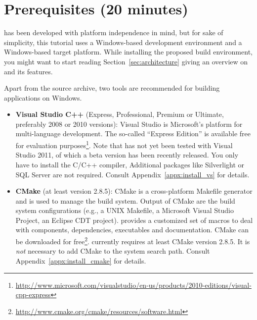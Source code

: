 %
% 
%
%
%
%

\section{Prerequisites (20 minutes)}
\xme has been developed with platform independence in mind, but for sake of simplicity,
this tutorial uses a Windows-based development environment and a Windows-based target platform.
%
While installing the proposed build environment, you might want to start reading Section~\ref{sec:architecture} giving an overview on \xme and its features.

Apart from the \xme source archive, two tools are recommended for building \xme applications on Windows.
\begin{itemize}
	\item \textbf{Visual Studio C++} (Express, Professional, Premium or Ultimate, preferably 2008 or 2010 versions):
		Visual Studio is Microsoft's platform for multi-language development.
		The so-called ``Express Edition'' is available free for evaluation purposes\footnote{%
		\url{http://www.microsoft.com/visualstudio/en-us/products/2010-editions/visual-cpp-express}}.
		Note that \xme has not yet been tested with Visual Studio 2011, of which a beta version has been recently released.
		You only have to install the C/C++ compiler, Additional packages like Silverlight or SQL Server are not required.
		Consult Appendix~\ref{appx:install_vs} for details.
	
	\item \textbf{CMake} (at least version 2.8.5):
		CMake is a cross-platform Makefile generator and is used to manage the build system.
		Output of CMake are the build system configurations (e.g., a UNIX Makefile, a Microsoft Visual Studio Project, an Eclipse CDT project).
		\xme provides a customized set of macros to deal with components, dependencies, executables and documentation.
		CMake can be downloaded for free\footnote{\url{http://www.cmake.org/cmake/resources/software.html}}.
		\xme currently requires at least CMake version 2.8.5.
		It is \emph{not} necessary to add CMake to the system search path.
		Consult Appendix~\ref{appx:install_cmake} for details.
\end{itemize}
